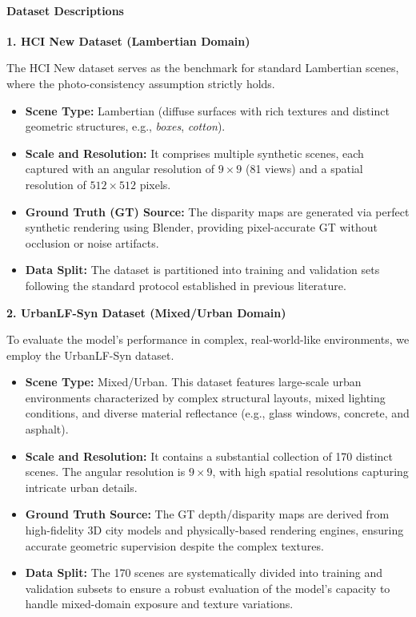 \documentclass[lettersize,journal]{IEEEtran}
\begin{document}
\paragraph{Dataset Descriptions}

\textbf{1. HCI New Dataset (Lambertian Domain)}

The HCI New dataset serves as the benchmark for standard Lambertian scenes, where the photo-consistency assumption strictly holds. 
\begin{itemize}
\item \textbf{Scene Type:} Lambertian (diffuse surfaces with rich textures and distinct geometric structures, e.g., \textit{boxes}, \textit{cotton}).
\item \textbf{Scale and Resolution:} It comprises multiple synthetic scenes, each captured with an angular resolution of $9 \times 9$ (81 views) and a spatial resolution of $512 \times 512$ pixels.
\item \textbf{Ground Truth (GT) Source:} The disparity maps are generated via perfect synthetic rendering using Blender, providing pixel-accurate GT without occlusion or noise artifacts.
\item \textbf{Data Split:} The dataset is partitioned into training and validation sets following the standard protocol established in previous literature.
\end{itemize}

\textbf{2. UrbanLF-Syn Dataset (Mixed/Urban Domain)}

To evaluate the model's performance in complex, real-world-like environments, we employ the UrbanLF-Syn dataset.
\begin{itemize}
\item \textbf{Scene Type:} Mixed/Urban. This dataset features large-scale urban environments characterized by complex structural layouts, mixed lighting conditions, and diverse material reflectance (e.g., glass windows, concrete, and asphalt).
\item \textbf{Scale and Resolution:} It contains a substantial collection of 170 distinct scenes. The angular resolution is $9 \times 9$, with high spatial resolutions capturing intricate urban details.
\item \textbf{Ground Truth Source:} The GT depth/disparity maps are derived from high-fidelity 3D city models and physically-based rendering engines, ensuring accurate geometric supervision despite the complex textures.
\item \textbf{Data Split:} The 170 scenes are systematically divided into training and validation subsets to ensure a robust evaluation of the model's capacity to handle mixed-domain exposure and texture variations.
\end{itemize}
\end{document}
